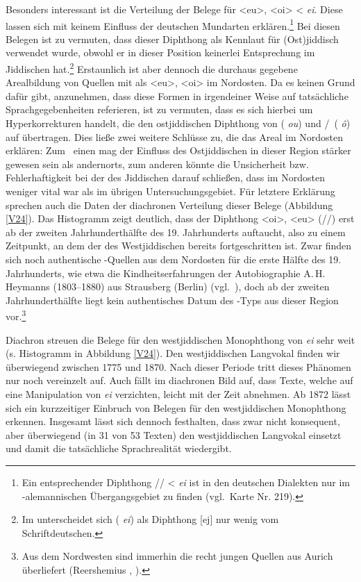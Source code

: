  Besonders interessant ist die Verteilung der Belege für <eu>, <oi> < {\mhd} \textit{ei}. Diese lassen sich mit keinem Einfluss der deutschen Mundarten erklären.\footnote{Ein entsprechender Diphthong // < {\mhd} \textit{ei} ist in den deutschen Dialekten nur im -alemannischen Übergangsgebiet zu finden (vgl.\,  Karte Nr. 219).} Bei diesen Belegen ist zu vermuten, dass dieser Diphthong als Kennlaut für (Ost)jid\-disch verwendet wurde, obwohl er in dieser Position keinerlei Entsprechung im Jiddischen hat.\footnote{Im \hai{{\OJ}} unterscheidet sich  ({\mhd} \textit{ei}) als Diphthong [ej] nur wenig vom Schriftdeutschen.} Erstaunlich ist aber dennoch die durchaus gegebene Arealbildung von Quellen mit  als <eu>, <oi> im Nordosten. Da es keinen Grund dafür gibt, anzunehmen, dass diese Formen in irgendeiner Weise auf tatsächliche Sprachgegebenheiten referieren, ist zu vermuten, dass es sich hierbei um Hyperkorrekturen handelt, die den ostjiddischen Diphthong von  ({\mhd} \textit{ou}) und /\, ({\mhd} \textit{ô}) auf  übertragen. Dies ließe zwei weitere Schlüsse zu, die das Areal im Nordosten erklären: Zum \,%
 einen mag der Einfluss des Ostjiddischen in dieser Region stärker gewesen sein als andernorts,  zum anderen könnte die Unsicherheit bzw. Fehlerhaftigkeit bei der  des Jiddischen darauf schließen, dass im Nordosten  weniger vital war als im übrigen Untersuchungsgebiet. Für letztere Erklärung sprechen auch die Daten der diachronen Verteilung dieser Belege (Abbildung \ref{V24}). Das Histogramm zeigt deutlich, dass der Diphthong <oi>, <eu> (//) erst ab der zweiten Jahrhunderthälfte des 19. Jahrhunderts auftaucht, also zu einem Zeitpunkt, an dem der  des Westjiddischen bereits fortgeschritten ist. Zwar finden sich noch authentische -Quellen aus dem Nordosten für die erste Hälfte des 19. Jahrhunderts, wie etwa die Kindheitserfahrungen der Autobiographie A.\,H. Heymanns (1803–1880) aus Strausberg (Berlin) (vgl.\, \citealt{Schaefer2013}), doch ab der zweiten Jahrhunderthälfte liegt kein authentisches Datum des -Typs aus dieser Region vor.\footnote{Aus dem Nordwesten sind immerhin die recht jungen Quellen aus Aurich überliefert (Reershemius \citeyear{Reershemius2007}, \citeyear{Reershemius2014}).}
 
 Diachron streuen die Belege für den westjiddischen Monophthong von {\mhd} \textit{ei} sehr weit (s. Histogramm in Abbildung \ref{V24}). Den westjiddischen Langvokal finden wir überwiegend zwischen 1775 und 1870. Nach dieser Periode tritt dieses Phänomen nur noch vereinzelt auf.  Auch fällt im diachronen Bild auf, dass Texte, welche auf eine Manipulation von {\mhd} \textit{ei} verzichten, leicht mit der Zeit abnehmen. Ab 1872 lässt sich  ein kurzzeitiger Einbruch von Belegen für den westjiddischen Monophthong erkennen. Insgesamt lässt sich dennoch festhalten, dass  zwar nicht konsequent, aber überwiegend (in 31 von 53 Texten) den westjiddischen Langvokal einsetzt und damit die tatsächliche Sprachrealität wiedergibt.
 
